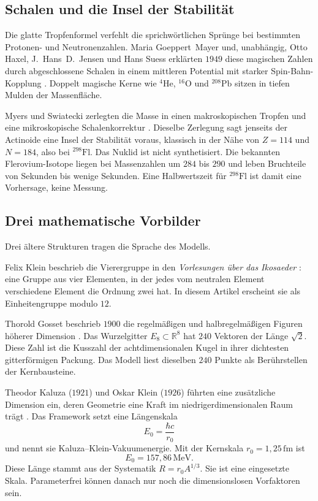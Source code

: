 \documentclass[11pt,a4paper]{article}
\theoremstyle{definition}
\theoremstyle{remark}
\newcommand{\Ee}{E_8}
\begin{document}
\subsection{Schalen und die Insel der Stabilität}

Die glatte Tropfenformel verfehlt die sprichwörtlichen Sprünge bei bestimmten Protonen- und Neutronenzahlen. Maria Goeppert~Mayer und, unabhängig, Otto Haxel, J.~Hans~D.\ Jensen und Hans Suess erklärten \(1949\) diese magischen Zahlen durch abgeschlossene Schalen in einem mittleren Potential mit starker Spin-Bahn-Kopplung \cite{Mayer1949,Haxel1949}. Doppelt magische Kerne wie \(^{4}\mathrm{He}\), \(^{16}\mathrm{O}\) und \(^{208}\mathrm{Pb}\) sitzen in tiefen Mulden der Massenfläche.

Myers und Swiatecki zerlegten die Masse in einen makroskopischen Tropfen und eine mikroskopische Schalenkorrektur \cite{Myers1966}. Dieselbe Zerlegung sagt jenseits der Actinoide eine Insel der Stabilität voraus, klassisch in der Nähe von \(Z=114\) und \(N=184\), also bei \(^{298}\mathrm{Fl}\). Das Nuklid ist nicht synthetisiert. Die bekannten Flerovium-Isotope liegen bei Massenzahlen um \(284\) bis \(290\) und leben Bruchteile von Sekunden bis wenige Sekunden. Eine Halbwertszeit für \(^{298}\mathrm{Fl}\) ist damit eine Vorhersage, keine Messung.

\subsection{Drei mathematische Vorbilder}

Drei ältere Strukturen tragen die Sprache des Modells.

Felix Klein beschrieb die Vierergruppe in den \emph{Vorlesungen über das Ikosaeder} \cite{Klein1884}: eine Gruppe aus vier Elementen, in der jedes vom neutralen Element verschiedene Element die Ordnung zwei hat. In diesem Artikel erscheint sie als Einheitengruppe modulo \(12\).

Thorold Gosset beschrieb \(1900\) die regelmäßigen und halbregelmäßigen Figuren höherer Dimension \cite{Gosset1900}. Das Wurzelgitter \(\Ee\subset\mathbb{R}^8\) hat \(240\) Vektoren der Länge \(\sqrt{2}\). Diese Zahl ist die Kusszahl der achtdimensionalen Kugel in ihrer dichtesten gitterförmigen Packung. Das Modell liest dieselben \(240\) Punkte als Berührstellen der Kernbausteine.

Theodor Kaluza (\(1921\)) und Oskar Klein (\(1926\)) führten eine zusätzliche Dimension ein, deren Geometrie eine Kraft im niedrigerdimensionalen Raum trägt \cite{Kaluza1921,Klein1926}. Das Framework setzt eine Längenskala
\begin{equation}
\label{eq:E0}
E_0=\frac{\hbar c}{r_0}
\end{equation}
und nennt sie Kaluza--Klein-Vakuumenergie. Mit der Kernskala \(r_0=1{,}25\,\mathrm{fm}\) ist
\begin{equation}
E_0=157{,}86\,\mathrm{MeV}.
\end{equation}
Diese Länge stammt aus der Systematik \(R=r_0 A^{1/3}\). Sie ist eine eingesetzte Skala. Parameterfrei können danach nur noch die dimensionslosen Vorfaktoren sein.
\end{document}
